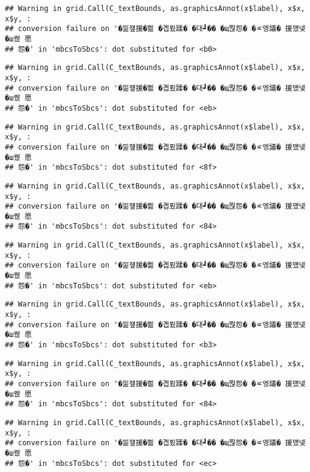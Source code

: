 \documentclass[
]{article}
\begin{document}
\begin{verbatim}
## Warning in grid.Call(C_textBounds, as.graphicsAnnot(x$label), x$x, x$y, :
## conversion failure on '�낆쟾援�쁾 �곕룄蹂� �대┛�� �щ쭩怨� �ㅼ엥議� 援먰넻�ш퀬 愿
## 怨�' in 'mbcsToSbcs': dot substituted for <b0>
\end{verbatim}

\begin{verbatim}
## Warning in grid.Call(C_textBounds, as.graphicsAnnot(x$label), x$x, x$y, :
## conversion failure on '�낆쟾援�쁾 �곕룄蹂� �대┛�� �щ쭩怨� �ㅼ엥議� 援먰넻�ш퀬 愿
## 怨�' in 'mbcsToSbcs': dot substituted for <eb>
\end{verbatim}

\begin{verbatim}
## Warning in grid.Call(C_textBounds, as.graphicsAnnot(x$label), x$x, x$y, :
## conversion failure on '�낆쟾援�쁾 �곕룄蹂� �대┛�� �щ쭩怨� �ㅼ엥議� 援먰넻�ш퀬 愿
## 怨�' in 'mbcsToSbcs': dot substituted for <8f>
\end{verbatim}

\begin{verbatim}
## Warning in grid.Call(C_textBounds, as.graphicsAnnot(x$label), x$x, x$y, :
## conversion failure on '�낆쟾援�쁾 �곕룄蹂� �대┛�� �щ쭩怨� �ㅼ엥議� 援먰넻�ш퀬 愿
## 怨�' in 'mbcsToSbcs': dot substituted for <84>
\end{verbatim}

\begin{verbatim}
## Warning in grid.Call(C_textBounds, as.graphicsAnnot(x$label), x$x, x$y, :
## conversion failure on '�낆쟾援�쁾 �곕룄蹂� �대┛�� �щ쭩怨� �ㅼ엥議� 援먰넻�ш퀬 愿
## 怨�' in 'mbcsToSbcs': dot substituted for <eb>
\end{verbatim}

\begin{verbatim}
## Warning in grid.Call(C_textBounds, as.graphicsAnnot(x$label), x$x, x$y, :
## conversion failure on '�낆쟾援�쁾 �곕룄蹂� �대┛�� �щ쭩怨� �ㅼ엥議� 援먰넻�ш퀬 愿
## 怨�' in 'mbcsToSbcs': dot substituted for <b3>
\end{verbatim}

\begin{verbatim}
## Warning in grid.Call(C_textBounds, as.graphicsAnnot(x$label), x$x, x$y, :
## conversion failure on '�낆쟾援�쁾 �곕룄蹂� �대┛�� �щ쭩怨� �ㅼ엥議� 援먰넻�ш퀬 愿
## 怨�' in 'mbcsToSbcs': dot substituted for <84>
\end{verbatim}

\begin{verbatim}
## Warning in grid.Call(C_textBounds, as.graphicsAnnot(x$label), x$x, x$y, :
## conversion failure on '�낆쟾援�쁾 �곕룄蹂� �대┛�� �щ쭩怨� �ㅼ엥議� 援먰넻�ш퀬 愿
## 怨�' in 'mbcsToSbcs': dot substituted for <ec>
\end{verbatim}
\end{document}

